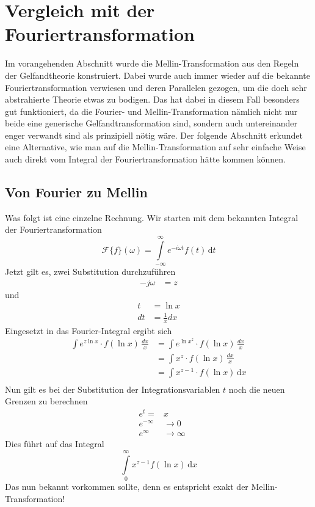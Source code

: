%
%
%
%
\section{Vergleich mit der Fouriertransformation
\label{mellin:section:teil3}}
Im vorangehenden Abschnitt wurde die Mellin-Transformation aus den Regeln der Gelfandtheorie konstruiert. 
Dabei wurde auch immer wieder auf die bekannte Fouriertransformation verwiesen und deren Parallelen gezogen, um die doch sehr abstrahierte 
Theorie etwas zu bodigen.
Das hat dabei in diesem Fall besonders gut funktioniert, da die Fourier- und Mellin-Transformation nämlich nicht nur beide eine generische 
Gelfandtransformation sind, sondern auch untereinander enger verwandt sind als prinzipiell nötig wäre.
Der folgende Abschnitt erkundet eine Alternative, wie man auf die Mellin-Transformation auf sehr einfache Weise auch direkt vom Integral 
der Fouriertransformation hätte kommen können.

\subsection{Von Fourier zu Mellin
\label{mellin:subsection:foumel}}
Was folgt ist eine einzelne Rechnung.
Wir starten mit dem bekannten Integral der Fouriertransformation
\begin{equation}
    \mathcal{F}\{f \}(\omega) = \int\limits_{-\infty}^{\infty} e^{-i\omega{}t} f(t) \,\mathrm{d}t
    \label{mellin:fourier}
\end{equation}
Jetzt gilt es, zwei Substitution durchzuführen
\[
    \begin{aligned}
        -j\omega &= z
    \end{aligned}
\]
und
\[
    \begin{aligned}
        t &= \ln x \\
        dt &= \frac{1}{x} dx
    \end{aligned}
\]
Eingesetzt in das Fourier-Integral ergibt sich
\[
    \begin{aligned}
    \int e^{z \ln x} \cdot f(\ln x) \,\frac{dx}{x} 
    &= \int e^{\ln x^z} \cdot f(\ln x) \,\frac{dx}{x} \\
    &= \int x^{z} \cdot f(\ln x) \,\frac{dx}{x} \\
    &= \int x^{z-1} \cdot f(\ln x) \,\mathrm{d}x \\
    \end{aligned}
\]
Nun gilt es bei der Substitution der Integrationsvariablen $t$ noch die neuen Grenzen zu berechnen
\[
    \begin{aligned}
        &e^{t} =& x \\
        &e^{-\infty} &\rightarrow 0 \\
        &e^{\infty} &\rightarrow \infty 
    \end{aligned}
\]
Dies führt auf das Integral
\[
    \int\limits_{0}^{\infty} x^{z-1} f(\ln x) \,\mathrm{d}x
\]
Das nun bekannt vorkommen sollte, denn es entspricht exakt der Mellin-Transformation!
\medskip

